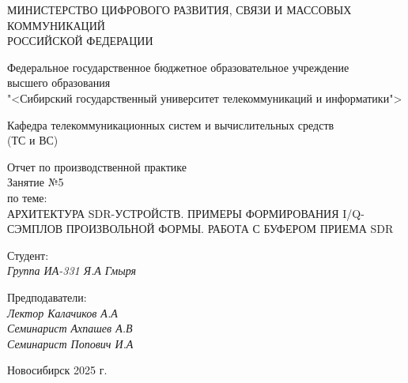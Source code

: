 \thispagestyle{empty}

\begin{center}
    МИНИСТЕРСТВО ЦИФРОВОГО РАЗВИТИЯ, СВЯЗИ И МАССОВЫХ КОММУНИКАЦИЙ \\ РОССИЙСКОЙ ФЕДЕРАЦИИ

    \vspace{20pt}

    Федеральное государственное бюджетное образовательное учреждение  \\  высшего образования \\
    "<Сибирский государственный университет телекоммуникаций и информатики"> \\

    \vspace{20pt}

    Кафедра телекоммуникационных систем и вычислительных средств \\  (ТС и ВС)
\end{center}

\vfill

\begin{center}
    Отчет по производственной практике \\  
    Занятие №5 \\

    \vspace{20pt}
    по теме: \\
    \uppercase{Архитектура SDR-устройств. Примеры формирования I/Q-сэмплов произвольной формы. Работа с буфером приема SDR}
\end{center}

\vfill

    \noindent Студент: \\
    \textit{Группа ИА-331 \hfill Я.А Гмыря}

    \vspace{20pt}

    \noindent Предподаватели: \\
    \textit{Лектор \hfill Калачиков А.А} \\
    \textit{Семинарист \hfill Ахпашев А.В} \\
    \textit{Семинарист \hfill Попович И.А}

\vfill

\begin{center}
    Новосибирск 2025 г.
\end{center}